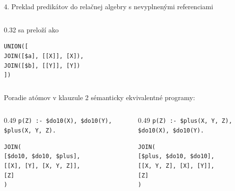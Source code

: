 \documentclass[11pt,aspectratio=169]{beamer}
\begin{document}
\begin{frame}{4. Preklad predikátov do relačnej algebry s nevyplnenými referenciami}
\begin{columns}[T,onlytextwidth]
\begin{column}{0.32\textwidth}
        \vspace{1em}
        sa preloží ako
        \vspace{1em}
        
        \texttt{UNION([\\
            \hspace{1em} JOIN([\$a], [[X]], [X]),\\
            \hspace{1em} JOIN([\$b], [[Y]], [Y])\\
            ])
        }
    \end{column}
\end{columns}
\end{frame}

\begin{frame}{Poradie atómov v klauzule}
    2 sémanticky ekvivalentné programy:
    \vspace{1em}
    
    \begin{columns}[T,onlytextwidth]
        \begin{column}{0.49\textwidth}
            \texttt{p(Z) :- \$do10(X), \$do10(Y),\\
                \hspace{3.5em} \$plus(X, Y, Z).
            }
            
            \vspace{3em}
            
            \texttt{JOIN(\\
                \hspace{1em} [\$do10, \$do10, \$plus],\\
                \hspace{1em} [[X], [Y], [X, Y, Z]],\\
                \hspace{1em} [Z]\\
                )
            }
        \end{column}
        \begin{column}{0.49\textwidth}
            \texttt{p(Z) :- \$plus(X, Y, Z),\\
                \hspace{3.5em} \$do10(X), \$do10(Y).
            }
            
            \vspace{3em}
            
            \texttt{JOIN(\\
                \hspace{1em} [\$plus, \$do10, \$do10],\\
                \hspace{1em} [[X, Y, Z], [X], [Y]],\\
                \hspace{1em} [Z]\\
                )
            }
        \end{column}
    \end{columns}
\end{frame}
\end{document}
